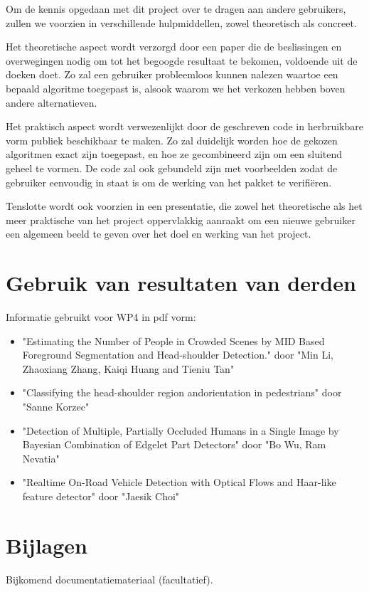 \documentclass[a4paper,oneside,11pt,final]{memoir}
\begin{document}
Om de kennis opgedaan met dit project over te dragen aan andere gebruikers, zullen we voorzien in verschillende hulpmiddellen, zowel theoretisch als concreet.

Het theoretische aspect wordt verzorgd door een paper die de beslissingen en overwegingen nodig om tot het begoogde resultaat te bekomen, voldoende uit de doeken doet. Zo zal een gebruiker probleemloos kunnen nalezen waartoe een bepaald algoritme toegepast is, alsook waarom we het verkozen hebben boven andere alternatieven.

Het praktisch aspect wordt verwezenlijkt door de geschreven code in herbruikbare vorm publiek beschikbaar te maken. Zo zal duidelijk worden hoe de gekozen algoritmen exact zijn toegepast, en hoe ze gecombineerd zijn om een sluitend geheel te vormen. De code zal ook gebundeld zijn met voorbeelden zodat de gebruiker eenvoudig in staat is om de werking van het pakket te verifiëren.

Tenslotte wordt ook voorzien in een presentatie, die zowel het theoretische als het meer praktische van het project oppervlakkig aanraakt om een nieuwe gebruiker een algemeen beeld te geven over het doel en werking van het project.

\section*{Gebruik van resultaten van derden}\label{sec:Gebruik}

Informatie gebruikt voor WP4 in pdf vorm:
\begin{itemize}
\item "Estimating the Number of People in Crowded Scenes by MID Based Foreground Segmentation and Head-shoulder Detection." door "Min Li, Zhaoxiang Zhang, Kaiqi Huang and Tieniu Tan"
\item "Classifying the head-shoulder region andorientation in pedestrians" door "Sanne Korzec"
\item "Detection of Multiple, Partially Occluded Humans in a Single Image by Bayesian Combination of Edgelet Part Detectors" door "Bo Wu, Ram Nevatia"
\item "Realtime On-Road Vehicle Detection with Optical Flows and Haar-like feature detector" door "Jaesik Choi"
\end{itemize}


\section*{Bijlagen} \label{sec:Bijlagen}
Bijkomend documentatiemateriaal (facultatief). 
\end{document}
